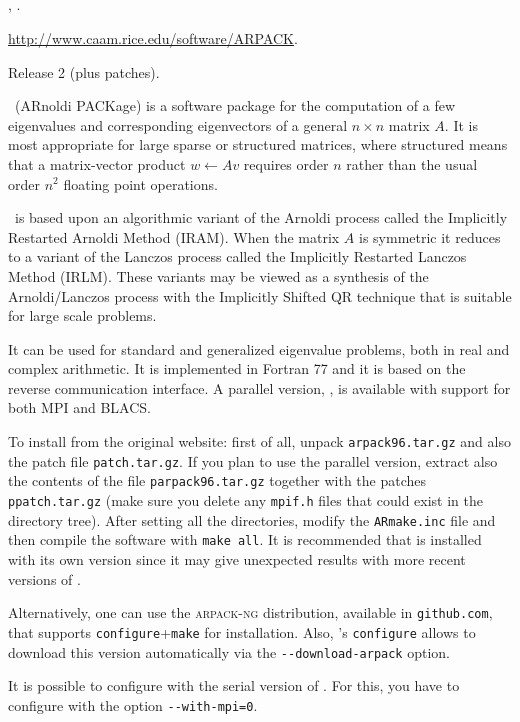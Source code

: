 \subsection*{\underline{\arpack}}
	\begin{description}
	\setlength{\itemsep}{0pt}
	\item[References.]\citep{Lehoucq:1998:AUG}, \citep{Maschhoff:1996:PEP}.
	\item[Website.] \url{http://www.caam.rice.edu/software/ARPACK}.
	\item[Version.] Release 2 (plus patches).
	\item[Summary.] \arpack\ (ARnoldi PACKage) is a software package for the computation of a few eigenvalues and corresponding eigenvectors of a general $n\times n$ matrix $A$. It is most appropriate for large sparse or structured matrices, where structured means that a matrix-vector product $w \leftarrow Av$ requires order $n$ rather than the usual order $n^2$ floating point operations.
	
	\arpack\ is based upon an algorithmic variant of the Arnoldi process called the Implicitly Restarted Arnoldi Method (IRAM). When the matrix $A$ is symmetric it reduces to a variant of the Lanczos process called the Implicitly Restarted Lanczos Method (IRLM). These variants may be viewed as a synthesis of the Arnoldi/Lanczos process with the Implicitly Shifted QR technique that is suitable for large scale problems.

	It can be used for standard and generalized eigenvalue problems, both in real and complex arithmetic. It is implemented in Fortran 77 and it is based on the reverse communication interface. A parallel version, \parpack, is available with support for both MPI and BLACS.
	\item[Installation.]
	To install from the original website: first of all, unpack \texttt{arpack96.tar.gz} and also the patch file \texttt{patch.tar.gz}. If you plan to use the parallel version, extract also the contents of the file \texttt{parpack96.tar.gz} together with the patches \texttt{ppatch.tar.gz} (make sure you delete any \texttt{mpif.h} files that could exist in the directory tree). After setting all the directories, modify the \texttt{ARmake.inc} file and then compile the software with \texttt{make all}. It is recommended that \arpack is installed with its own \lapack version since it may give unexpected results with more recent versions of \lapack.

	Alternatively, one can use the \textsc{arpack-ng} distribution, available in \texttt{github.com}, that supports \texttt{configure}+\texttt{make} for installation. Also, \slepc's \texttt{configure} allows to download this version automatically via the \texttt{-{}-download-arpack} option.

	It is possible to configure \slepc with the serial version of \arpack. For this, you have to configure \petsc with the option \texttt{-{}-with-mpi=0}.
	\end{description}


